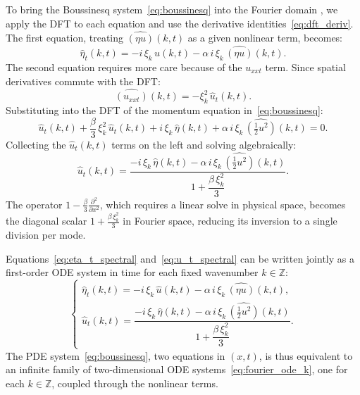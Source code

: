 To bring the Boussinesq system~\eqref{eq:boussinesq} into the Fourier domain \parencite{martins2023}, we apply the DFT to each equation and use the derivative identities~\eqref{eq:dft_deriv}. The first equation, treating $\widehat{(\eta u)}(k,t)$ as a given nonlinear term, becomes:
\begin{equation}\label{eq:eta_t_spectral}
    \hat{\eta}_t(k,t) = -i\,\xi_k\,\hat{u}(k,t)
    - \alpha\, i\,\xi_k\,\widehat{(\eta u)}(k,t).
\end{equation}
The second equation requires more care because of the $u_{xxt}$ term. Since spatial derivatives commute with the DFT:
\begin{equation}
    \widehat{(u_{xxt})}(k,t) = -\xi_k^2\,\hat{u}_t(k,t).
\end{equation}
Substituting into the DFT of the momentum equation in~\eqref{eq:boussinesq}:
\begin{equation}
    \hat{u}_t(k,t) + \frac{\beta}{3}\,\xi_k^2\,\hat{u}_t(k,t)
    + i\,\xi_k\,\hat{\eta}(k,t)
    + \alpha\, i\,\xi_k\,\widehat{\!\left(\tfrac{1}{2}u^2\right)}(k,t) = 0.
\end{equation}
Collecting the $\hat{u}_t(k,t)$ terms on the left and solving algebraically:
\begin{equation}\label{eq:u_t_spectral}
    \hat{u}_t(k,t) = \frac{
        -i\,\xi_k\,\hat{\eta}(k,t)
        - \alpha\, i\,\xi_k\,\widehat{\!\left(\tfrac{1}{2}u^2\right)}(k,t)
    }{
        1 + \dfrac{\beta\,\xi_k^2}{3}
    }.
\end{equation}
The operator $1 - \frac{\beta}{3}\frac{\partial^2}{\partial x^2}$, which requires a linear solve in physical space, becomes the diagonal scalar $1 + \frac{\beta\,\xi_k^2}{3}$ in Fourier space, reducing its inversion to a single division per mode.

Equations~\eqref{eq:eta_t_spectral} and~\eqref{eq:u_t_spectral} can be written jointly as a first-order ODE system in time for each fixed wavenumber $k \in \mathbb{Z}$:
\begin{equation}\label{eq:fourier_ode_k}
\begin{cases}
    \hat{\eta}_t(k,t) = -i\,\xi_k\,\hat{u}(k,t) - \alpha\,i\,\xi_k\,\widehat{(\eta u)}(k,t), \\[8pt]
    \hat{u}_t(k,t) = \dfrac{-i\,\xi_k\,\hat{\eta}(k,t) - \alpha\,i\,\xi_k\,\widehat{\!\left(\tfrac{1}{2}u^2\right)}\!(k,t)}{1 + \dfrac{\beta\,\xi_k^2}{3}}.
\end{cases}
\end{equation}
The PDE system~\eqref{eq:boussinesq}, two equations in $(x,t)$, is thus equivalent to an infinite family of two-dimensional ODE systems~\eqref{eq:fourier_ode_k}, one for each $k \in \mathbb{Z}$, coupled through the nonlinear terms.

